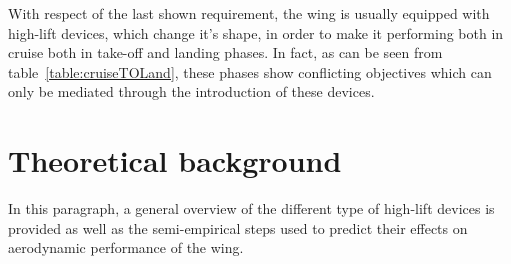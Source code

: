 \noindent
With respect of the last shown requirement, the wing is usually equipped with high-lift devices, which change it's shape, in order to make it performing both in cruise both in take-off and landing phases. In fact, as can be seen from table~\ref{table:cruiseTOLand}, these phases show conflicting objectives which can only be mediated through the introduction of these devices.
%
\begin{table}[H]
\caption{Comparison between cruise and take-off/landing design requirements}
\label{table:cruiseTOLand}
\end{table}
%
\section{Theoretical background}
\label{sec:theoryFlapSlat}
In this paragraph, a general overview of the different type of high-lift devices is provided as well as the semi-empirical steps used to predict their effects on aerodynamic performance of the wing.

